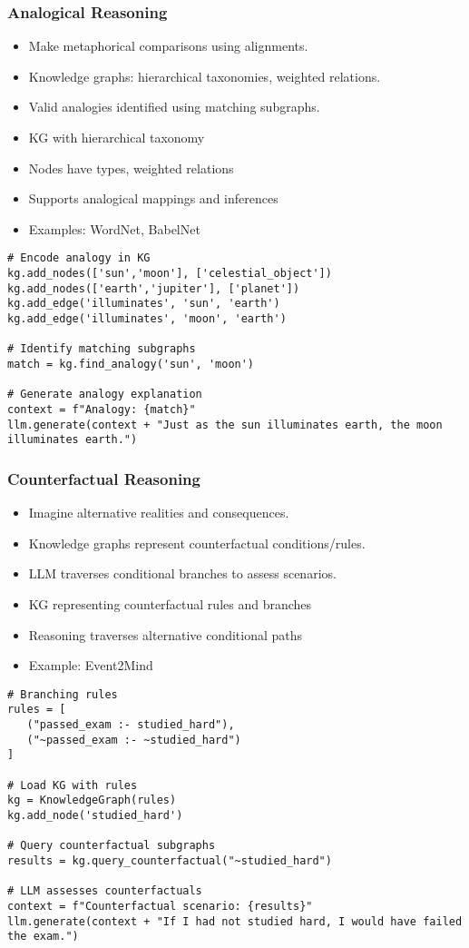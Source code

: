 \begin{frame}[fragile]
\frametitle{Analogical Reasoning}
\begin{itemize}
    \item Make metaphorical comparisons using alignments.
    \item Knowledge graphs: hierarchical taxonomies, weighted relations.
    \item Valid analogies identified using matching subgraphs.
	\item KG with hierarchical taxonomy
	\item Nodes have types, weighted relations
	\item Supports analogical mappings and inferences
	\item Examples: WordNet, BabelNet
\end{itemize}

\begin{lstlisting}
# Encode analogy in KG
kg.add_nodes(['sun','moon'], ['celestial_object'])  
kg.add_nodes(['earth','jupiter'], ['planet'])
kg.add_edge('illuminates', 'sun', 'earth') 
kg.add_edge('illuminates', 'moon', 'earth')

# Identify matching subgraphs  
match = kg.find_analogy('sun', 'moon') 

# Generate analogy explanation
context = f"Analogy: {match}"  
llm.generate(context + "Just as the sun illuminates earth, the moon illuminates earth.")
\end{lstlisting}
\end{frame}

\begin{frame}[fragile]
\frametitle{Counterfactual Reasoning}
\begin{itemize}
    \item Imagine alternative realities and consequences.
    \item Knowledge graphs represent counterfactual conditions/rules.
    \item LLM traverses conditional branches to assess scenarios.
	\item KG representing counterfactual rules and branches
	\item Reasoning traverses alternative conditional paths
	\item Example: Event2Mind
\end{itemize}

\begin{lstlisting}
# Branching rules
rules = [
   ("passed_exam :- studied_hard"),
   ("~passed_exam :- ~studied_hard")
]

# Load KG with rules
kg = KnowledgeGraph(rules)
kg.add_node('studied_hard') 

# Query counterfactual subgraphs
results = kg.query_counterfactual("~studied_hard")

# LLM assesses counterfactuals
context = f"Counterfactual scenario: {results}"
llm.generate(context + "If I had not studied hard, I would have failed the exam.")
\end{lstlisting}
\end{frame}

